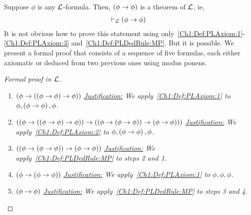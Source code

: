 \begin{boxexample}\label{Ch1:Eg:Self_implies_self}
    Suppose $\phi$ is any $\mathcal{L}$-formula. Then, $\left( \phi \to \phi \right)$ is a theorem of $\mathcal{L}$, ie,
    \begin{align}
        \vdash_{\mathcal{L}} \left( \phi \to \phi \right)
        \label{Ch1:Eq:Self_implies_self}
    \end{align}
    It is not obvious how to prove this statement using only~\ref{Ch1:Def:PLAxiom:1}-\ref{Ch1:Def:PLAxiom:3} and~\ref{Ch1:Def:PLDedRule:MP}. But it is possible. We present a formal proof that consists of a sequence of five formulas, each either axiomatic or deduced from two previous ones using modus ponens.
    \begin{proof}[Formal proof in $\mathcal{L}$]\hfill
        \begin{enumerate}
            \item $\left( \phi \to \left( \left( \phi \to \phi \right) \to \phi \right) \right)$
            \newline
            \textit{\underline{Justification:}
                We apply~\ref{Ch1:Def:PLAxiom:1} to $\phi, \left( \phi \to \phi \right), \phi$.
            }

            \item $\left( \left( \phi \to \left( \left( \phi \to \phi \right) \to \phi \right) \right) \to \left( \left( \phi \to \left( \phi \to \phi \right) \right) \to \left( \phi \to \phi \right) \right) \right)$
            \newline
            \textit{\underline{Justification:}
                We apply~\ref{Ch1:Def:PLAxiom:2} to $\phi, \left( \phi \to \phi \right), \phi$.
            }

            \item $\left( \left( \phi \to \left( \phi \to \phi \right) \right) \to \left( \phi \to \phi \right) \right)$
            \newline
            \textit{\underline{Justification:}
            We apply~\ref{Ch1:Def:PLDedRule:MP} to steps 2 and 1. %
            }

            \item $\left( \phi \to \left( \phi \to \phi \right) \right)$
            \newline
            \textit{\underline{Justification:}
                We apply~\ref{Ch1:Def:PLAxiom:1} to $\phi, \phi, \phi$.
            }

            \item $\left( \phi \to \phi \right)$
            \newline
            \textit{\underline{Justification:}
                We apply~\ref{Ch1:Def:PLDedRule:MP} to steps 3 and 4.
            }
        \end{enumerate}
    \end{proof}
\end{boxexample}


